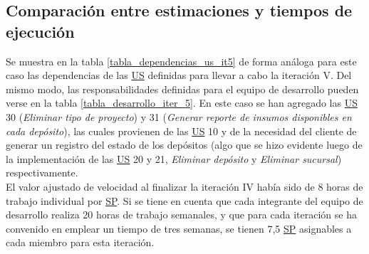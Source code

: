 \documentclass[a4paper, 12pt,twoside]{report}  %
\numberwithin{equation}{subsection} %
\begin{document}
\subsection{Comparación entre estimaciones y tiempos de ejecución}
Se muestra en la tabla \ref{tabla_dependencias_us_it5} de forma análoga para este caso las dependencias de las \hyperlink{US}{US} definidas para llevar a cabo la iteración V. Del mismo modo, las responsabilidades definidas para el equipo de desarrollo pueden verse en la tabla \ref{tabla_desarrollo_iter_5}. En este caso se han agregado las \hyperlink{US}{US} 30 (\textit{Eliminar tipo de proyecto}) y 31 (\textit{Generar reporte de insumos disponibles en cada depósito}), las cuales provienen de las \hyperlink{US}{US} 10 y de la necesidad del cliente de generar un registro del estado de los depósitos (algo que se hizo evidente luego de la implementación de las \hyperlink{US}{US} 20 y 21, \textit{Eliminar depósito} y \textit{Eliminar sucursal}) respectivamente.\\
\indent El valor ajustado de velocidad al finalizar la iteración IV había sido de 8 horas de trabajo individual por \hyperlink{SP}{SP}. Si se tiene en cuenta que cada integrante del equipo de desarrollo realiza 20 horas de trabajo semanales, y que para cada iteración se ha convenido en emplear un tiempo de tres semanas, se tienen 7,5 \hyperlink{SP}{SP} asignables a cada miembro para esta iteración.
\end{document}
